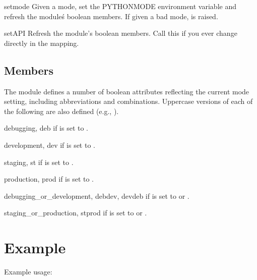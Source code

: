 \documentclass{manual}
\begin{document}
\begin{funcdesc}{set}{mode}
Given a mode, set the PYTHONMODE environment variable and refresh the module\'s
boolean members. If given a bad mode,  is raised.
\end{funcdesc}

\begin{funcdesc}{setAPI}{}
Refresh the module's boolean members. Call this if you ever change
 directly in the  mapping.
\end{funcdesc}

\section{Members}

The module defines a number of boolean attributes reflecting the current mode
setting, including abbreviations and combinations. Uppercase versions of each of
the following are also defined (e.g., ).

\begin{datadesc}{debugging, deb}
 if  is set to .
\end{datadesc}
\begin{datadesc}{development, dev}
 if  is set to .
\end{datadesc}
\begin{datadesc}{staging, st}
 if  is set to .
\end{datadesc}
\begin{datadesc}{production, prod}
 if  is set to .
\end{datadesc}
\begin{datadesc}{debugging_or_development, debdev, devdeb}
 if  is set to  or .
\end{datadesc}
\begin{datadesc}{staging_or_production, stprod}
 if  is set to  or .
\end{datadesc}


\chapter{Example}

Example usage:
\end{document}
